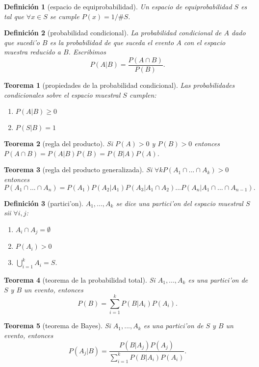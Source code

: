 \documentclass[a4paper,spanish]{article}
\newtheorem{teo}{Teorema}
\newtheorem{defi}{Definici\'on}
\begin{document}
\begin{defi}[espacio de equiprobabilidad]
Un espacio de equiprobabilidad $S$ es tal que $\forall x \in S$ se cumple
$P({x}) = 1 / \#S$.
\end{defi}

\begin{defi}[probabilidad condicional]
La probabilidad condicional de $A$ dado que sucedi'o $B$ es la probabilidad de
que suceda el evento $A$ con el espacio muestra reducido a $B$. Escribimos
$$P(A | B) = \frac{P (A \cap B)}{P(B)}.$$
\end{defi}

\begin{teo}[propiedades de la probabilidad condicional]
Las probabilidades condicionales sobre el espacio muestral $S$ cumplen:
\begin{enumerate}
\item $P(A|B) \geq 0$
\item $P(S|B) = 1$
\end{enumerate}
\end{teo}

\begin{teo}[regla del producto]
Si $P(A)>0$ y $P(B)>0$ entonces $P(A \cap B) = P(A|B)P(B) = P(B|A)P(A)$.
\end{teo}

\begin{teo}[regla del producto generalizada]
Si $\forall k P(A_1 \cap ... \cap A_k) > 0$ entonces
$$P(A_1 \cap ... \cap A_n) = P(A_1)P(A_2|A_1)P(A_3|A_1 \cap A_2) ...
	P(A_n|A_1 \cap ... \cap A_{n-1}).$$
\end{teo}

\begin{defi}[partici'on]
$A_1,...,A_k$ se dice una \emph{partici'on del espacio muestral} $S$ sii 
$\forall i,j$:
\begin{enumerate}
\item $A_i \cap A_j = \emptyset$
\item $P(A_i) > 0$
\item $\bigcup_{i=1}^k A_i = S$.
\end{enumerate}
\end{defi}

\begin{teo}[teorema de la probabilidad total]
Si $A_1,...,A_k$ es una partici'on de $S$ y $B$ un evento, entonces
$$P(B) = \sum_{i=1}^k P(B|A_i)P(A_i).$$
\end{teo}

\begin{teo}[teorema de Bayes]
Si $A_1,...,A_k$ es una partici'on de $S$ y $B$ un evento, entonces
$$P(A_j | B) = \frac{P(B | A_j)P(A_j)}{\sum_{i=1}^k P(B|A_i)P(A_i)}.$$
\end{teo}
\end{document}
